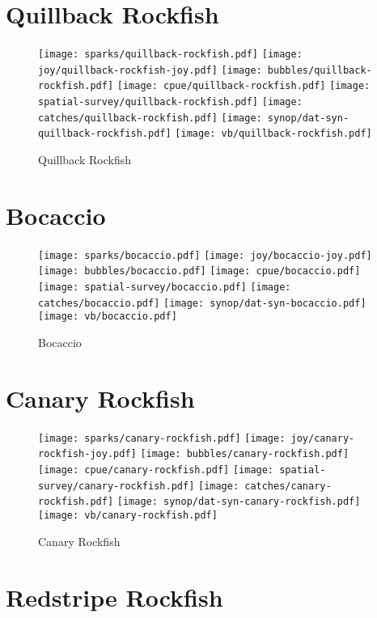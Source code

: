 \section{Quillback Rockfish}

\begin{figure}[htbp]
\centering
\texttt{[image: sparks/quillback-rockfish.pdf]}
\texttt{[image: joy/quillback-rockfish-joy.pdf]}
\texttt{[image: bubbles/quillback-rockfish.pdf]}
\texttt{[image: cpue/quillback-rockfish.pdf]}
\texttt{[image: spatial-survey/quillback-rockfish.pdf]}
\texttt{[image: catches/quillback-rockfish.pdf]}
\texttt{[image: synop/dat-syn-quillback-rockfish.pdf]}
\texttt{[image: vb/quillback-rockfish.pdf]}
\caption{Quillback Rockfish}
\end{figure}
\clearpage
\section{Bocaccio}

\begin{figure}[htbp]
\centering
\texttt{[image: sparks/bocaccio.pdf]}
\texttt{[image: joy/bocaccio-joy.pdf]}
\texttt{[image: bubbles/bocaccio.pdf]}
\texttt{[image: cpue/bocaccio.pdf]}
\texttt{[image: spatial-survey/bocaccio.pdf]}
\texttt{[image: catches/bocaccio.pdf]}
\texttt{[image: synop/dat-syn-bocaccio.pdf]}
\texttt{[image: vb/bocaccio.pdf]}
\caption{Bocaccio}
\end{figure}
\clearpage
\section{Canary Rockfish}

\begin{figure}[htbp]
\centering
\texttt{[image: sparks/canary-rockfish.pdf]}
\texttt{[image: joy/canary-rockfish-joy.pdf]}
\texttt{[image: bubbles/canary-rockfish.pdf]}
\texttt{[image: cpue/canary-rockfish.pdf]}
\texttt{[image: spatial-survey/canary-rockfish.pdf]}
\texttt{[image: catches/canary-rockfish.pdf]}
\texttt{[image: synop/dat-syn-canary-rockfish.pdf]}
\texttt{[image: vb/canary-rockfish.pdf]}
\caption{Canary Rockfish}
\end{figure}
\clearpage
\section{Redstripe Rockfish}

